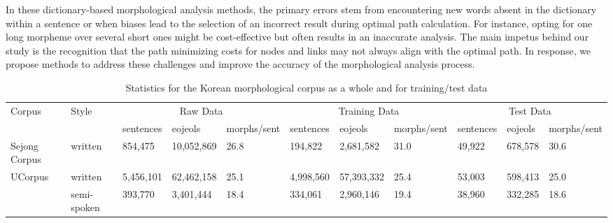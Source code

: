 \documentclass[AMS,STIX2COL]{WileyNJD-v2}
\begin{document}
    In these dictionary-based morphological analysis methods, the primary errors stem from encountering new words absent in the dictionary within a sentence or when biases lead to the selection of an incorrect result during optimal path calculation.
    For instance, opting for one long morpheme over several short ones might be cost-effective but often results in an inaccurate analysis.
    The main impetus behind our study is the recognition that the path minimizing costs for nodes and links may not always align with the optimal path.
    In response, we propose methods to address these challenges and improve the accuracy of the morphological analysis process.

    \begin{table}[h]
        \centering
        \footnotesize
        \caption{Statistics for the Korean morphological corpus as a whole and for training/test data}
        \label{tab:data-statistics}
        \begin{tabular}{m{20mm}m{14mm}m{10mm}m{12mm}m{10mm}m{10mm}m{12mm}m{10mm}m{10mm}m{12mm}m{10mm}}
            \toprule
            \multirow{2}{*}{Corpus}            & \multirow{2}{*}{Style} & \multicolumn{3}{c}{Raw Data}                 & \multicolumn{3}{c}{Training Data}            & \multicolumn{3}{c}{Test Data}             \\
            \cmidrule(lr){3-5} \cmidrule(lr){6-8} \cmidrule(lr){9-11}
            ~                                  & ~                      & sentences & eojeols    & morphs\newline/sent & sentences & eojeols    & morphs\newline/sent & sentences & eojeols & morphs\newline/sent \\
            \midrule
            Sejong Corpus                      & written                & 854,475   & 10,052,869 & 26.8                & 194,822   & 2,681,582  & 31.0                & 49,922    & 678,578 & 30.6                \\
            \midrule
            \multirow{3}{*}{UCorpus}           & written                & 5,456,101 & 62,462,158 & 25.1                & 4,998,560 & 57,393,332 & 25.4                & 53,003    & 598,413 & 25.0                \\
            ~                                  & semi-spoken            & 393,770   & 3,401,444  & 18.4                & 334,061   & 2,960,146  & 19.4                & 38,960    & 332,285 & 18.6                \\

\end{tabular}
\end{table}
\end{document}
